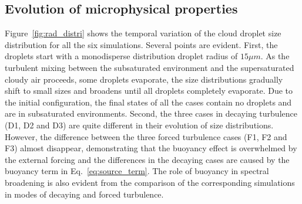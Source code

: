 \documentclass[draft,linenumbers]{agujournal}
\newcommand{\Eq}[1]{Eq.~\eqref{#1}} \newcommand{\Fig}[1]{Figure~\ref{#1}}
\begin{document}
\subsection{Evolution of microphysical properties}
\Fig{fig:rad_distri} shows the temporal variation of the cloud droplet size distribution for all the six simulations. Several points are evident. First, the droplets start with a monodisperse distribution droplet radius of $15\mu m$. As the turbulent mixing between the subsaturated environment and the supersaturated cloudy air proceeds, some droplets evaporate, the size distributions gradually shift to small sizes and broadens until all droplets completely evaporate. Due to the initial configuration, the final states of all the cases contain no droplets and are in subsaturated environments. Second, the three cases in decaying turbulence (D1, D2 and D3) are quite different in their evolution of size distributions. However, the difference between the three forced turbulence cases (F1, F2 and F3) almost disappear, demonstrating that the buoyancy effect is overwhelmed by the external forcing and the differences in the decaying cases are caused by the buoyancy term in \Eq{eq:source_term}. The role of buoyancy in spectral broadening is also evident from the comparison of the corresponding simulations in modes of decaying and forced turbulence.
\end{document}
